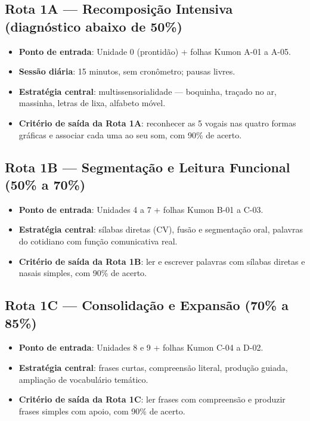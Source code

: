 \subsection{Rota 1A --- Recomposição Intensiva (diagnóstico abaixo de 50\%)}

\begin{itemize}
  \item \textbf{Ponto de entrada}: Unidade 0 (prontidão) + folhas Kumon A-01 a A-05.
  \item \textbf{Sessão diária}: 15 minutos, sem cronômetro; pausas livres.
  \item \textbf{Estratégia central}: multissensorialidade --- boquinha, traçado no ar,
        massinha, letras de lixa, alfabeto móvel.
  \item \textbf{Critério de saída da Rota 1A}: reconhecer as 5 vogais nas quatro
        formas gráficas e associar cada uma ao seu som, com 90\% de acerto.
\end{itemize}

\subsection{Rota 1B --- Segmentação e Leitura Funcional (50\% a 70\%)}

\begin{itemize}
  \item \textbf{Ponto de entrada}: Unidades 4 a 7 + folhas Kumon B-01 a C-03.
  \item \textbf{Estratégia central}: sílabas diretas (CV), fusão e segmentação
        oral, palavras do cotidiano com função comunicativa real.
  \item \textbf{Critério de saída da Rota 1B}: ler e escrever palavras com
        sílabas diretas e nasais simples, com 90\% de acerto.
\end{itemize}

\subsection{Rota 1C --- Consolidação e Expansão (70\% a 85\%)}

\begin{itemize}
  \item \textbf{Ponto de entrada}: Unidades 8 e 9 + folhas Kumon C-04 a D-02.
  \item \textbf{Estratégia central}: frases curtas, compreensão literal,
        produção guiada, ampliação de vocabulário temático.
  \item \textbf{Critério de saída da Rota 1C}: ler frases com compreensão e
        produzir frases simples com apoio, com 90\% de acerto.
\end{itemize}

